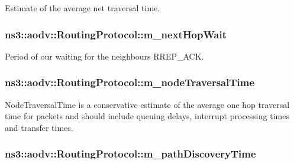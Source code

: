 Estimate of the average net traversal time. 

\subsubsection[{\texorpdfstring{m\+\_\+next\+Hop\+Wait}{m_nextHopWait}}]{ ns3\+::aodv\+::\+Routing\+Protocol\+::m\+\_\+next\+Hop\+Wait\hspace{0.3cm}{\ttfamily [private]}}\hypertarget{classns3_1_1aodv_1_1RoutingProtocol_aeac3f146e52514d060a69f1a2d62690b}{}\label{classns3_1_1aodv_1_1RoutingProtocol_aeac3f146e52514d060a69f1a2d62690b}


Period of our waiting for the neighbour\textquotesingle{}s R\+R\+E\+P\+\_\+\+A\+CK. 

\subsubsection[{\texorpdfstring{m\+\_\+node\+Traversal\+Time}{m_nodeTraversalTime}}]{ ns3\+::aodv\+::\+Routing\+Protocol\+::m\+\_\+node\+Traversal\+Time\hspace{0.3cm}{\ttfamily [private]}}\hypertarget{classns3_1_1aodv_1_1RoutingProtocol_ad467863779ea1559ad5942ff6c24a706}{}\label{classns3_1_1aodv_1_1RoutingProtocol_ad467863779ea1559ad5942ff6c24a706}
Node\+Traversal\+Time is a conservative estimate of the average one hop traversal time for packets and should include queuing delays, interrupt processing times and transfer times. 
\subsubsection[{\texorpdfstring{m\+\_\+path\+Discovery\+Time}{m_pathDiscoveryTime}}]{ ns3\+::aodv\+::\+Routing\+Protocol\+::m\+\_\+path\+Discovery\+Time\hspace{0.3cm}{\ttfamily [private]}}\hypertarget{classns3_1_1aodv_1_1RoutingProtocol_a491c2fe5559a8153343df590999b468f}{}\label{classns3_1_1aodv_1_1RoutingProtocol_a491c2fe5559a8153343df590999b468f}


